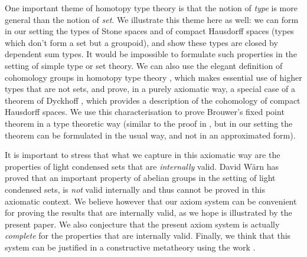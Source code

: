 One important theme of homotopy type theory is that the notion of {\em type} is more general than the notion of {\em set}. We illustrate
this theme here as well: we can form in our setting the types of Stone spaces and of compact Hausdorff spaces
(types which don't form a set but a groupoid),
and show these types are
closed by dependent sum types. It would be impossible to formulate such properties in the setting of simple type or set theory.
We can also use the elegant definition of cohomology groups in homotopy type theory \cite{hott}, which makes essential
use of higher types that are not sets, and prove, in a purely axiomatic way,
a special case of a theorem of Dyckhoff \cite{dyckhoff76}, which provides
a description of the cohomology of compact Hausdorff spaces. We use this characterisation to prove Brouwer's fixed point theorem
in a type theoretic way (similar to the proof in \cite{shulman-Brouwer-fixed-point}, but
in our setting the theorem can be formulated in the usual
way, and not in an approximated form).

It is important to stress that what we capture in this axiomatic way are the properties of light condensed
sets that are {\em internally} valid. David W\"arn \cite{warn2024} has proved that an important property of abelian
groups in the setting of light condensed sets, is {\em not} valid internally and thus cannot be proved in this axiomatic context.
We believe however that our axiom system can be convenient for proving the results that are internally valid, as we hope
is illustrated by the present paper. We also conjecture that the present axiom system is actually {\em complete}
for the properties that are internally valid. Finally, we think that this system can be justified in a constructive metatheory
using the work \cite{CRS21}.
